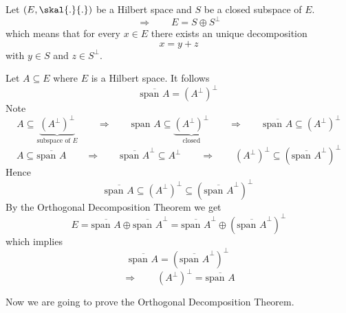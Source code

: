 
\begin{theorem}
	Let $(E, \skal{.}{.})$ be a Hilbert space and $S$ be a closed subspace of $E$. 
	\[
		\Rightarrow \qquad E = S \oplus S^{\perp}
	\]
	which means that for every $x \in E$ there exists an unique decomposition
	\[
		x = y + z
	\]
	with $y \in S$ and $z \in S^{\perp}$.
\end{theorem}
\begin{beispiel}
	Let $A \subseteq E$ where $E$ is a Hilbert space. It follows
	\[
		\overline{\text{span }A} = \left( A^{\perp} \right)^{\perp}
	\]
	Note 
	\[
		A \subseteq \underset{\text{subspace of $E$}}{\underbrace{ \left( A^{\perp} \right)^{\perp}}} \qquad \Rightarrow \qquad \text{span }A \subseteq 
		\underset{\text{closed}}{\underbrace{ \left( A^{\perp} \right)^{\perp}}} \qquad \Rightarrow \qquad \overline{\text{span }A} \subseteq 
		\left( A^{\perp} \right)^{\perp}
	\]
	\[
		A \subseteq \overline{\text{span }A} \qquad \Rightarrow \qquad \overline{\text{span }A}^{\perp} \subseteq A^{\perp} \qquad \Rightarrow \qquad 
		\left( A^{\perp} \right)^{\perp} \subseteq \left( \overline{\text{span }A}^{\perp} \right)^{\perp}
	\]
	Hence
	\[
		\overline{\text{span }A} \subseteq \left( A^{\perp} \right)^{\perp} \subseteq \left( \overline{\text{span }A}^{\perp} \right)^{\perp}
	\]
	By the Orthogonal Decomposition Theorem we get
	\[
		E = \overline{\text{span }A} \oplus \overline{\text{span }A}^{\perp} = \overline{\text{span }A}^{\perp} \oplus \left( \overline{\text{span }A}^{\perp} \right)^{\perp} 
	\]
	which implies
	\[
		\overline{\text{span }A} = \left( \overline{\text{span }A}^{\perp} \right)^{\perp}
	\]
	\[
		\Rightarrow \qquad \left( A^{\perp} \right)^{\perp} = \overline{\text{span }A}
	\]
\end{beispiel}

Now we are going to prove the Orthogonal Decomposition Theorem.

